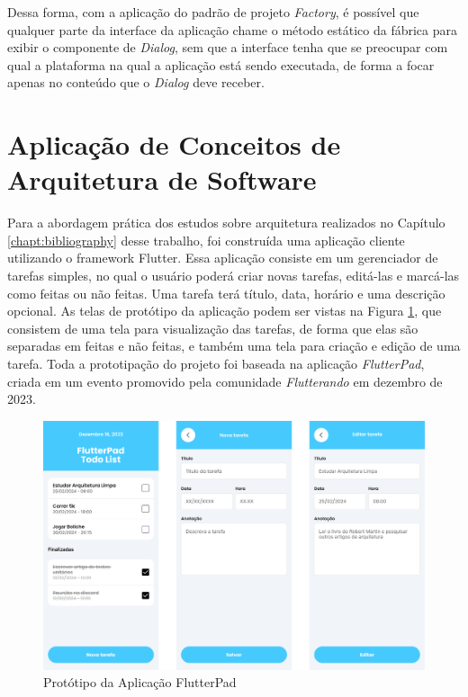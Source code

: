 \documentclass[12pt, %
openright, 
oneside, %
a4paper,    %
brazil]{facom-ufu-abntex2}
\begin{document}
Dessa forma, com a aplicação do padrão de projeto \textit{Factory}, é possível que qualquer parte da interface da aplicação chame o método estático da fábrica para exibir o componente de \textit{Dialog}, sem que a interface tenha que se preocupar com qual a plataforma na qual a aplicação está sendo executada, de forma a focar apenas no conteúdo que o \textit{Dialog} deve receber.

\section{Aplicação de Conceitos de Arquitetura de Software} \label{sec:arch}

Para a abordagem prática dos estudos sobre arquitetura realizados no Capítulo \ref{chapt:bibliography} desse trabalho, foi construída uma aplicação cliente utilizando o framework Flutter. Essa aplicação consiste em um gerenciador de tarefas simples, no qual o usuário poderá criar novas tarefas, editá-las e marcá-las como feitas ou não feitas. Uma tarefa terá título, data, horário e uma descrição opcional. As telas de protótipo da aplicação podem ser vistas na Figura \ref{fig:flutterpad_figma}, que consistem de uma tela para visualização das tarefas, de forma que elas são separadas em feitas e não feitas, e também uma tela para criação e edição de uma tarefa. Toda a prototipação do projeto foi baseada na aplicação \textit{FlutterPad}, criada em um evento promovido pela comunidade \textit{Flutterando} em dezembro de 2023.

\begin{figure}[ht]
    \centering
    \includegraphics[width=.85\textwidth]{figures/arch/flutterpad_figma.png}
    \caption{Protótipo da Aplicação FlutterPad}
    \label{fig:flutterpad_figma}
\end{figure}
\end{document}
